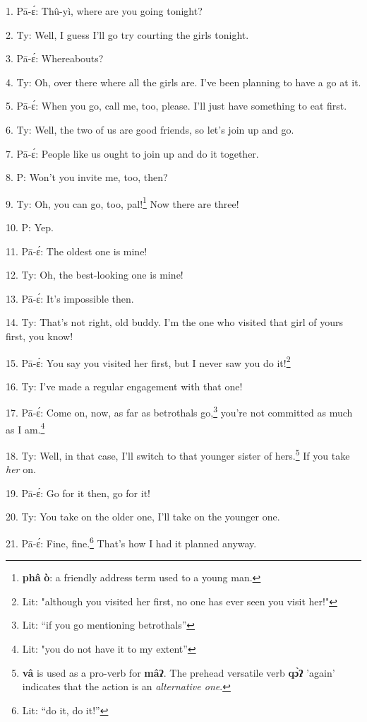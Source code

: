 \setcounter{footnote}{0}

1. Pā-ɛ́: Thû-yì, where are you going tonight?

2. Ty: Well, I guess I'll go try courting the girls tonight.

3. Pā-ɛ́: Whereabouts?

4. Ty: Oh, over there where all the girls are. I've been planning to have
a go at it.

5. Pā-ɛ́: When you go, call me, too, please. I'll just have something to eat
first.

6. Ty: Well, the two of us are good friends, so let's join up and go.

7. Pā-ɛ́: People like us ought to join up and do it together.

8. P: Won't you invite me, too, then?

9. Ty: Oh, you can go, too, pal!\footnote{\textbf{phâ} \textbf{ò}: a friendly address term used to a young man.} Now there are three!

10. P: Yep.

11. Pā-ɛ́: The oldest one is mine!

12. Ty: Oh, the best-looking one is mine!

13. Pā-ɛ́: It's impossible then.

14. Ty: That's not right, old buddy. I'm the one who visited that girl of
yours first, you know!

15. Pā-ɛ́: You say you visited her first, but I never saw you do it!\footnote{Lit: "although you visited her first, no one has ever seen you visit her!"}

16. Ty: I've made a regular engagement with that one!

17. Pā-ɛ́: Come on, now, as far as betrothals go,\footnote{Lit: ``if you go mentioning betrothals''} you're not committed as
much as I am.\footnote{Lit: "you do not have it to my extent''}

18. Ty: Well, in that case, I'll switch to that younger sister of hers.\footnote{\textbf{vâ} is used as a pro-verb for \textbf{mâʔ}. The prehead versatile verb \textbf{qɔ̀ʔ} 'again' indicates that the action is an \textit{alternative one}.}
If you take \textit{her} on.

19. Pā-ɛ́: Go for it then, go for it!

20. Ty: You take on the older one, I'll take on the younger one.

21. Pā-ɛ́: Fine, fine.\footnote{Lit: ``do it, do it!''} That's how I had it planned anyway.

